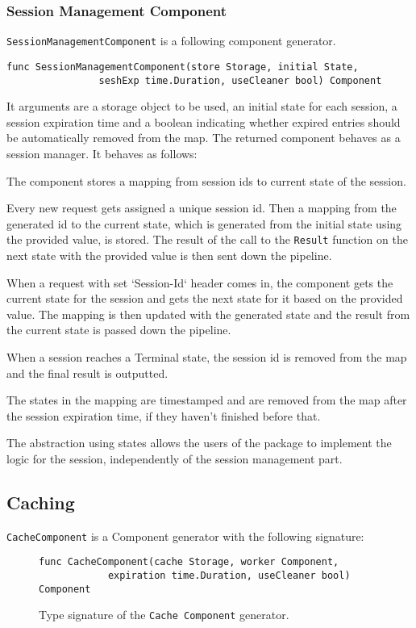 \subsubsection{Session Management Component}
\texttt{SessionManagementComponent} is a following component generator.
\begin{lstlisting}
func SessionManagementComponent(store Storage, initial State, 
                seshExp time.Duration, useCleaner bool) Component
\end{lstlisting}

It arguments are a storage object to be used, an initial state for each session,
a session expiration time and a boolean indicating whether expired
entries should be automatically removed from the map.
The returned component behaves as a session manager. 
It behaves as follows:

The component stores a mapping from session ids to current state of the session.

Every new request gets assigned a unique session id. Then a mapping from the generated 
id to the current state, which is generated from the initial state using the provided value,
is stored. The result of the call to the \texttt{Result} function on the next state with the provided 
value is then sent down the pipeline.

When a request with set `Session-Id` header comes in, the component gets the current 
state for the session and gets the next state for it based on the provided value.
The mapping is then updated with the generated state and the result from the current state
is passed down the pipeline.

When a session reaches a Terminal state, the session id is removed from the map
and the final result is outputted.

The states in the mapping are timestamped and are removed from the map after
the session expiration time, if they haven't finished before that.

The abstraction using states allows the users of the package to implement the
logic for the session, independently of the session management part.

\subsection{Caching}
\texttt{CacheComponent} is a Component generator with the following signature:
\begin{figure}[h]
\centering
\begin{lstlisting}
func CacheComponent(cache Storage, worker Component, 
            expiration time.Duration, useCleaner bool) Component
\end{lstlisting}
\caption[scale=1.0]{Type signature of the \texttt{Cache Component} generator.}
\label{fig:cacheComp}
\end{figure}

